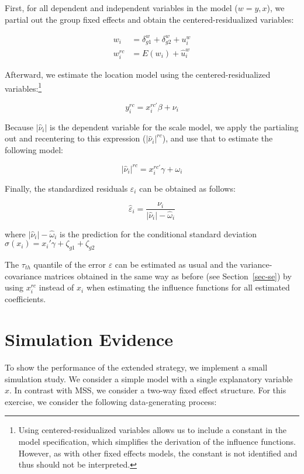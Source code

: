 \documentclass[
  12pt,
  oneside]{article}
\begin{document}
First, for all dependent and independent variables in the model
(\(w=y,x\)), we partial out the group fixed effects and obtain the
centered-residualized variables:

\[\begin{aligned}
w_{i} &= \delta_{g1}^w + \delta_{g2}^w + u_{i}^w \\
w_{i}^{rc} &= E(w_{i}) + \hat{u}_{i}^w
\end{aligned}
\]

Afterward, we estimate the location model using the
centered-residualized variables:\footnote{Using centered-residualized
  variables allows us to include a constant in the model specification,
  which simplifies the derivation of the influence functions. However,
  as with other fixed effects models, the constant is not identified and
  thus should not be interpreted.}

\[y_{i}^{rc} = x_{i}^{rc'} \beta + \nu_{i}
\]

Because \(|\hat \nu_i|\) is the dependent variable for the scale model,
we apply the partialing out and recentering to this expression
(\(|\hat \nu_i|^{rc}\)), and use that to estimate the following model:

\[|\hat\nu_{i}|^{rc} = x_{i}^{rc'} \gamma + \omega_{i}\]

Finally, the standardized residuals \(\varepsilon_i\) can be obtained as
follows:

\[\hat{\varepsilon}_{i} = \frac{\nu_{i}}{|\hat\nu_{i}|- \hat \omega_{i}}\]

where \(|\hat\nu_{i}|- \hat \omega_{i}\) is the prediction for the
conditional standard deviation
\(\sigma(x_i)=x_{i}' \gamma + \zeta_{g1} + \zeta_{g2}\)

The \(\tau_{th}\) quantile of the error \(\varepsilon\) can be estimated
as usual and the variance-covariance matrices obtained in the same way
as before (see Section~\ref{sec-se}) by using \(x_{i}^{rc}\) instead of
\(x_{i}\) when estimating the influence functions for all estimated
coefficients.

\section{Simulation Evidence}\label{simulation-evidence}

To show the performance of the extended strategy, we implement a small
simulation study. We consider a simple model with a single explanatory
variable \(x\). In contrast with MSS, we consider a two-way fixed effect
structure. For this exercise, we consider the following data-generating
process:
\end{document}
